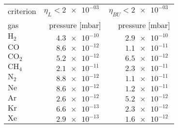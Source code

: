 %
	\begin{tabular}[b]{@{} l r r @{}}
		\toprule
		        criterion & $\eta_{L} < \SI{2e-03}{}$ & $\eta_{BU} < \SI{2e-03}{}$ \\
		              gas &           pressure [mbar] &            pressure [mbar] \\
		\midrule
		 $\mathrm{H_{2}}$ &          $\SI{4.3e-10}{}$ &           $\SI{2.9e-10}{}$ \\
		    $\mathrm{CO}$ &          $\SI{8.6e-12}{}$ &           $\SI{1.1e-11}{}$ \\
		$\mathrm{CO_{2}}$ &          $\SI{5.2e-12}{}$ &           $\SI{6.5e-12}{}$ \\
		$\mathrm{CH_{4}}$ &          $\SI{2.1e-11}{}$ &           $\SI{2.3e-11}{}$ \\
		 $\mathrm{N_{2}}$ &          $\SI{8.8e-12}{}$ &           $\SI{1.1e-11}{}$ \\
		    $\mathrm{Ne}$ &          $\SI{8.6e-12}{}$ &           $\SI{1.2e-11}{}$ \\
		    $\mathrm{Ar}$ &          $\SI{2.6e-12}{}$ &           $\SI{5.2e-12}{}$ \\
		    $\mathrm{Kr}$ &          $\SI{6.6e-13}{}$ &           $\SI{2.3e-12}{}$ \\
		    $\mathrm{Xe}$ &          $\SI{2.9e-13}{}$ &           $\SI{1.6e-12}{}$ \\
		\bottomrule
	\end{tabular}